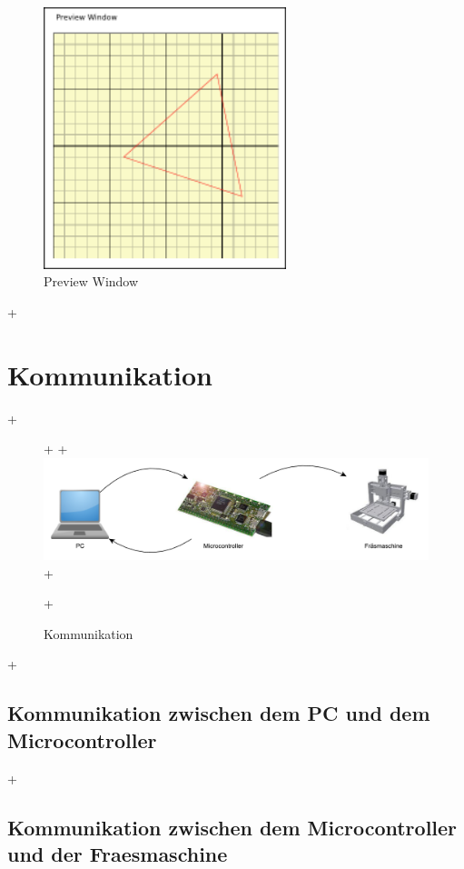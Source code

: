 \documentclass[11pt,a4paper,bibtotoc,oneside]{scrbook}
\begin{document}
    \begin{figure}[H]
    \centering
        \includegraphics[width=200pt]{./picture/gui_preview.png}
        \caption{\label{main}{Preview Window}}
    \end{figure}

+\chapter{Kommunikation}
+\begin{figure}[!ht]
+    \centering
+        \includegraphics[width=360pt]{./picture/Kommunikation.pdf}
+        \caption{\label{lm324}{Kommunikation}}
+\end{figure}
+\section{Kommunikation zwischen dem PC und dem Microcontroller}
+\section{Kommunikation zwischen dem Microcontroller und der Fraesmaschine}


\end{document}
